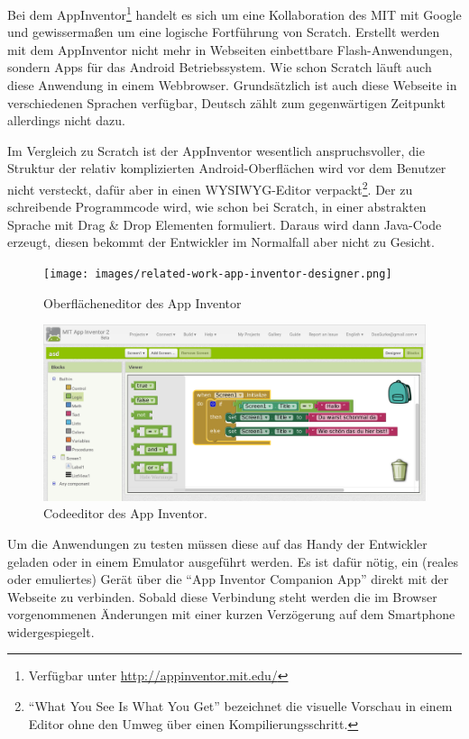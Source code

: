 Bei dem AppInventor\footnote{Verfügbar unter \url{http://appinventor.mit.edu/}} handelt es sich um eine Kollaboration des MIT mit Google und gewissermaßen um eine logische Fortführung von Scratch. Erstellt werden mit dem AppInventor nicht mehr in Webseiten einbettbare Flash-Anwendungen, sondern Apps für das Android Betriebssystem. Wie schon Scratch läuft auch diese Anwendung in einem Webbrowser. Grundsätzlich ist auch diese Webseite in verschiedenen Sprachen verfügbar, Deutsch zählt zum gegenwärtigen Zeitpunkt allerdings nicht dazu.

Im Vergleich zu Scratch ist der AppInventor wesentlich anspruchsvoller, die Struktur der relativ komplizierten Android-Oberflächen wird vor dem Benutzer nicht versteckt, dafür aber in einen WYSIWYG-Editor verpackt\footnote{"`What You See Is What You Get"' bezeichnet die visuelle Vorschau in einem Editor ohne den Umweg über einen Kompilierungsschritt.}. Der zu schreibende Programmcode wird, wie schon bei Scratch, in einer abstrakten Sprache mit Drag \& Drop Elementen formuliert. Daraus wird dann Java-Code erzeugt, diesen bekommt der Entwickler im Normalfall aber nicht zu Gesicht.

\begin{figure}[h]
  \centering \texttt{[image: images/related-work-app-inventor-designer.png]}
  \caption{Oberflächeneditor des App Inventor}
  \label{fig:app-inventor-ui-designer}
\end{figure}

\begin{figure}[h]
  \centering \includegraphics[width=\textwidth]{images/related-work-app-inventor-blocks.png}
  \caption{Codeeditor des App Inventor.}
  \label{fig:app-inventor-block-designer}
\end{figure}

Um die Anwendungen zu testen müssen diese auf das Handy der Entwickler geladen oder in einem Emulator ausgeführt werden. Es ist dafür nötig, ein (reales oder emuliertes) Gerät über die "`App Inventor Companion App"' direkt mit der Webseite zu verbinden. Sobald diese Verbindung steht werden die im Browser vorgenommenen Änderungen mit einer kurzen Verzögerung auf dem Smartphone widergespiegelt.

